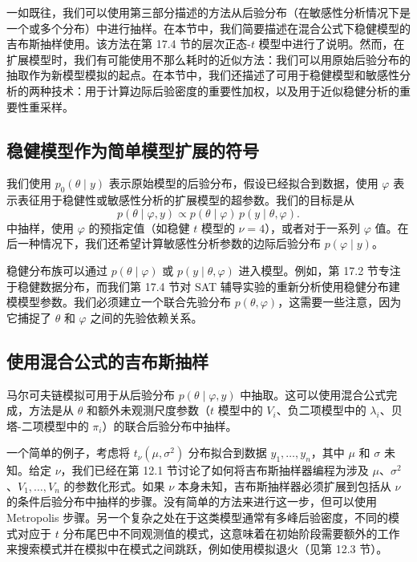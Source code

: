 一如既往，我们可以使用第三部分描述的方法从后验分布（在敏感性分析情况下是一个或多个分布）中进行抽样。在本节中，我们简要描述在混合公式下稳健模型的吉布斯抽样使用。该方法在第 17.4 节的层次正态-$t$ 模型中进行了说明。然而，在扩展模型时，我们有可能使用不那么耗时的近似方法：我们可以用原始后验分布的抽取作为新模型模拟的起点。在本节中，我们还描述了可用于稳健模型和敏感性分析的两种技术：用于计算边际后验密度的重要性加权，以及用于近似稳健分析的重要性重采样。

\subsection{稳健模型作为简单模型扩展的符号}

我们使用 $p_0(\theta \mid y)$ 表示原始模型的后验分布，假设已经拟合到数据，使用 $\varphi$ 表示表征用于稳健性或敏感性分析的扩展模型的超参数。我们的目标是从
\[
p(\theta \mid \varphi, y) \propto p(\theta \mid \varphi) \, p(y \mid \theta, \varphi).
\label{eq:robust-extension-posterior}
\]
中抽样，使用 $\varphi$ 的预指定值（如稳健 $t$ 模型的 $\nu = 4$），或者对于一系列 $\varphi$ 值。在后一种情况下，我们还希望计算敏感性分析参数的边际后验分布 $p(\varphi \mid y)$。

稳健分布族可以通过 $p(\theta \mid \varphi)$ 或 $p(y \mid \theta, \varphi)$ 进入模型。例如，第 17.2 节专注于稳健数据分布，而我们第 17.4 节对 SAT 辅导实验的重新分析使用稳健分布建模模型参数。我们必须建立一个联合先验分布 $p(\theta, \varphi)$，这需要一些注意，因为它捕捉了 $\theta$ 和 $\varphi$ 之间的先验依赖关系。

\subsection{使用混合公式的吉布斯抽样}

马尔可夫链模拟可用于从后验分布 $p(\theta \mid \varphi, y)$ 中抽取。这可以使用混合公式完成，方法是从 $\theta$ 和额外未观测尺度参数（$t$ 模型中的 $V_i$、负二项模型中的 $\lambda_i$、贝塔-二项模型中的 $\pi_i$）的联合后验分布中抽样。

一个简单的例子，考虑将 $t_\nu(\mu, \sigma^2)$ 分布拟合到数据 $y_1, \ldots, y_n$，其中 $\mu$ 和 $\sigma$ 未知。给定 $\nu$，我们已经在第 12.1 节讨论了如何将吉布斯抽样器编程为涉及 $\mu$、$\sigma^2$、$V_1, \ldots, V_n$ 的参数化形式。如果 $\nu$ 本身未知，吉布斯抽样器必须扩展到包括从 $\nu$ 的条件后验分布中抽样的步骤。没有简单的方法来进行这一步，但可以使用 Metropolis 步骤。另一个复杂之处在于这类模型通常有多峰后验密度，不同的模式对应于 $t$ 分布尾巴中不同观测值的模式，这意味着在初始阶段需要额外的工作来搜索模式并在模拟中在模式之间跳跃，例如使用模拟退火（见第 12.3 节）。

